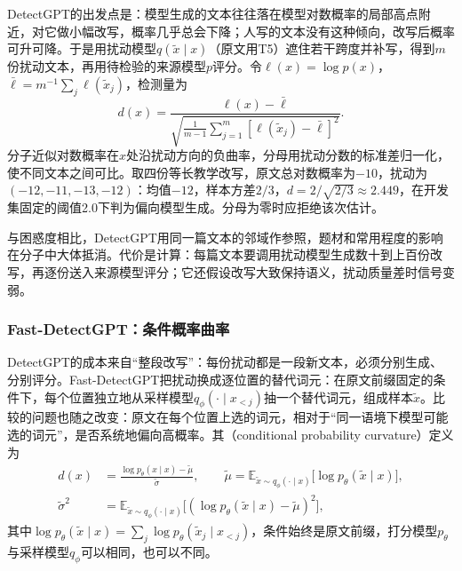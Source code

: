 DetectGPT的出发点是：模型生成的文本往往落在模型对数概率的局部高点附近，对它做小幅改写，概率几乎总会下降；人写的文本没有这种倾向，改写后概率可升可降。于是用扰动模型$q(\widetilde x\mid x)$（原文用T5）遮住若干跨度并补写，得到$m$份扰动文本，再用待检验的来源模型$p$评分。令$\ell(x)=\log p(x)$，$\bar\ell=m^{-1}\sum_j\ell(\widetilde x_j)$，检测量为
\begin{equation}
  \label{eq:nlp-classification-detectgpt}
  d(x)=\frac{\ell(x)-\bar\ell}
  {\sqrt{\frac{1}{m-1}\sum_{j=1}^{m}
  [\ell(\widetilde x_j)-\bar\ell]^2}}.
\end{equation}
分子近似对数概率在$x$处沿扰动方向的负曲率，分母用扰动分数的标准差归一化，使不同文本之间可比。取四份等长教学改写，原文总对数概率为$-10$，扰动为$(-12,-11,-13,-12)$：均值$-12$，样本方差$2/3$，$d=2/\sqrt{2/3}\approx2.449$，在开发集固定的阈值2.0下判为偏向模型生成。分母为零时应拒绝该次估计。

与困惑度相比，DetectGPT用同一篇文本的邻域作参照，题材和常用程度的影响在分子中大体抵消。代价是计算：每篇文本要调用扰动模型生成数十到上百份改写，再逐份送入来源模型评分；它还假设改写大致保持语义，扰动质量差时信号变弱。

\subsubsection{Fast-DetectGPT：条件概率曲率}
\label{sec:nlp-classification-fast-detectgpt}

DetectGPT的成本来自“整段改写”：每份扰动都是一段新文本，必须分别生成、分别评分。Fast-DetectGPT把扰动换成逐位置的替代词元：在原文前缀固定的条件下，每个位置独立地从采样模型$q_\phi(\cdot\mid x_{<j})$抽一个替代词元，组成样本$\widetilde x$。比较的问题也随之改变：原文在每个位置上选的词元，相对于“同一语境下模型可能选的词元”，是否系统地偏向高概率。其（conditional probability curvature）定义为
\begin{equation}
  \label{eq:nlp-classification-fast-detectgpt}
  \begin{aligned}
    d(x)&=\frac{\log p_\theta(x\mid x)-\tilde\mu}{\tilde\sigma},\qquad
    \tilde\mu=\mathbb E_{\widetilde x\sim q_\phi(\cdot\mid x)}\bigl[\log p_\theta(\widetilde x\mid x)\bigr],\\
    \tilde\sigma^2&=\mathbb E_{\widetilde x\sim q_\phi(\cdot\mid x)}\bigl[(\log p_\theta(\widetilde x\mid x)-\tilde\mu)^2\bigr],
  \end{aligned}
\end{equation}
其中$\log p_\theta(\widetilde x\mid x)=\sum_j\log p_\theta(\widetilde x_j\mid x_{<j})$，条件始终是原文前缀，打分模型$p_\theta$与采样模型$q_\phi$可以相同，也可以不同。

